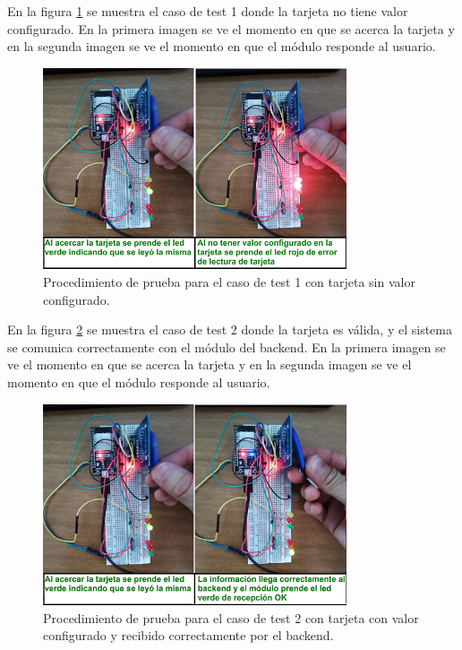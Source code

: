 En la figura \ref{fig:TestTajetaSinCodigo} se muestra el caso de test 1 donde la tarjeta no tiene valor configurado. En la primera imagen se ve el momento en que se acerca la tarjeta y en la segunda imagen se ve el momento en que el módulo responde al usuario.


\begin{figure}[ht]
	\centering
	\includegraphics[width=0.8\textwidth]{./Figures/TestTajetaSinCodigo.png}
	\caption{Procedimiento de prueba para el caso de test 1 con tarjeta sin valor configurado.}
	\label{fig:TestTajetaSinCodigo}
\end{figure}

\clearpage
En la figura \ref{fig:TestTajetaCodigoLeida} se muestra el caso de test 2 donde la tarjeta es válida, y el sistema se comunica correctamente con el módulo del backend. En la primera imagen se ve el momento en que se acerca la tarjeta y en la segunda imagen se ve el momento en que el módulo responde al usuario.


\begin{figure}[ht]
	\centering
	\includegraphics[width=0.8\textwidth]{./Figures/TestTajetaCodigoLeida.png}
	\caption{Procedimiento de prueba para el caso de test 2 con tarjeta con valor configurado y recibido correctamente por el backend.}
	\label{fig:TestTajetaCodigoLeida}
\end{figure}



